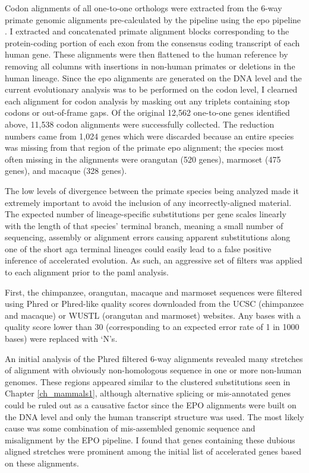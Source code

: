 Codon alignments of all one-to-one orthologs were extracted from the
6-way primate genomic alignments pre-calculated by the \ens pipeline
using the \ac{epo} pipeline \citep{Paten2008a,Paten2008}. I extracted
and concatenated primate alignment blocks corresponding to the
protein-coding portion of each exon from the consensus coding
transcript of each human gene. These alignments were then flattened to
the human reference by removing all columns with insertions in
non-human primates or deletions in the human lineage. Since the
\ac{epo} alignments are generated on the DNA level and the current
evolutionary analysis was to be performed on the codon level, I
clearned each alignment for codon analysis by masking out any triplets
containing stop codons or out-of-frame gaps. Of the original 12,562
one-to-one genes identified above, 11,538 codon alignments were
successfully collected. The reduction numbers came from 1,024 genes
which were discarded because an entire species was missing from that
region of the primate \ac{epo} alignment; the species most often
missing in the alignments were orangutan (520 genes), marmoset (475 genes),
and macaque (328 genes).

The low levels of divergence between the primate species being
analyzed made it extremely important to avoid the inclusion of any
incorrectly-aligned material. The expected number of lineage-specific
substitutions per gene scales linearly with the length of that
species' terminal branch, meaning a small number of sequencing,
assembly or alignment errors causing apparent \nsyn substitutions
along one of the short \ac{aga} terminal lineages could easily lead to
a false positive inference of accelerated evolution. As such, an
aggressive set of filters was applied to each alignment prior to the
\ac{paml} analysis.

First, the chimpanzee, orangutan, macaque and marmoset sequences were
filtered using Phred or Phred-like quality scores downloaded from the
UCSC (chimpanzee and macaque) or WUSTL (orangutan and marmoset)
websites. Any bases with a quality score lower than 30 (corresponding
to an expected error rate of 1 in 1000 bases) were replaced with `N's.

An initial analysis of the Phred filtered 6-way alignments revealed
many stretches of alignment with obviously non-homologous sequence in
one or more non-human genomes. These regions appeared similar to the
clustered substitutions seen in Chapter \ref{ch_mammals1}, although
alternative splicing or mis-annotated genes could be ruled out as a
causative factor since the EPO alignments were built on the DNA level
and only the human transcript structure was used. The most likely
cause was some combination of mis-assembled genomic sequence and
misalignment by the EPO pipeline. I found that genes containing these
dubious aligned stretches were prominent among the initial list of
accelerated genes based on these alignments.

